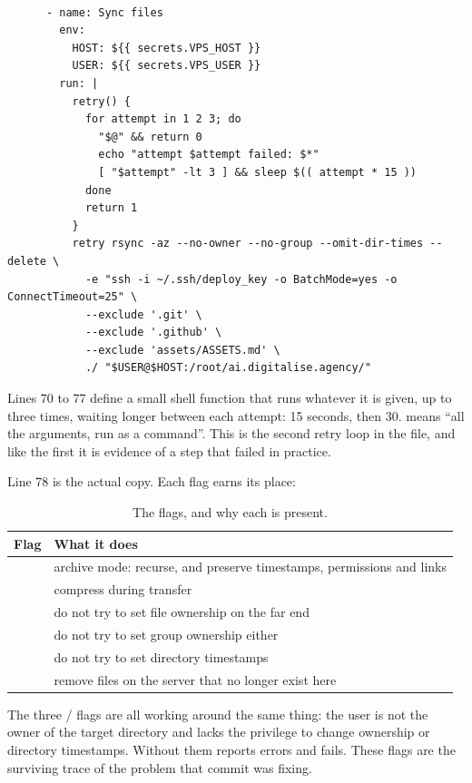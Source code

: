 \begin{lstlisting}[firstnumber=64,caption={\file{deploy.yml.disabled}, lines 64--83}]

      - name: Sync files
        env:
          HOST: ${{ secrets.VPS_HOST }}
          USER: ${{ secrets.VPS_USER }}
        run: |
          retry() {
            for attempt in 1 2 3; do
              "$@" && return 0
              echo "attempt $attempt failed: $*"
              [ "$attempt" -lt 3 ] && sleep $(( attempt * 15 ))
            done
            return 1
          }
          retry rsync -az --no-owner --no-group --omit-dir-times --delete \
            -e "ssh -i ~/.ssh/deploy_key -o BatchMode=yes -o ConnectTimeout=25" \
            --exclude '.git' \
            --exclude '.github' \
            --exclude 'assets/ASSETS.md' \
            ./ "$USER@$HOST:/root/ai.digitalise.agency/"
\end{lstlisting}

Lines 70 to 77 define a small shell function that runs whatever it is given, up to
three times, waiting longer between each attempt: 15 seconds, then 30. 
means ``all the arguments, run as a command''. This is the second retry loop in the
file, and like the first it is evidence of a step that failed in practice.

Line 78 is the actual copy. Each flag earns its place:

\begin{table}[H]\centering\small
\begin{tabular}{@{}ll@{}}
\toprule
Flag & What it does \\
\midrule
\code{-a} & archive mode: recurse, and preserve timestamps, permissions and links \\
\code{-z} & compress during transfer \\
\code{-{}-no-owner} & do not try to set file ownership on the far end \\
\code{-{}-no-group} & do not try to set group ownership either \\
\code{-{}-omit-dir-times} & do not try to set directory timestamps \\
\code{-{}-delete} & remove files on the server that no longer exist here \\
\bottomrule
\end{tabular}
\caption{The \code{rsync} flags, and why each is present.}
\end{table}

The three / flags are all working around the same thing: the
\code{deploy} user is not the owner of the target directory and lacks the privilege
to change ownership or directory timestamps. Without them  reports
errors and fails. These flags are the surviving trace of the problem that commit
 was fixing.

